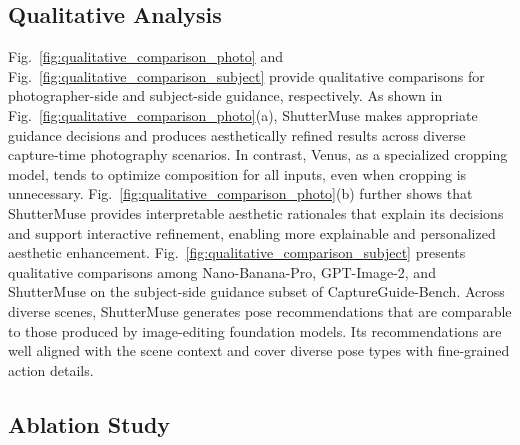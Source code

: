 \documentclass{llmxive}
\begin{document}
\subsection{Qualitative Analysis}

Fig.~\ref{fig:qualitative_comparison_photo} and Fig.~\ref{fig:qualitative_comparison_subject} provide qualitative comparisons for photographer-side and subject-side guidance, respectively. As shown in Fig.~\ref{fig:qualitative_comparison_photo}(a), ShutterMuse makes appropriate guidance decisions and produces aesthetically refined results across diverse capture-time photography scenarios. In contrast, Venus, as a specialized cropping model, tends to optimize composition for all inputs, even when cropping is unnecessary. Fig.~\ref{fig:qualitative_comparison_photo}(b) further shows that ShutterMuse provides interpretable aesthetic rationales that explain its decisions and support interactive refinement, enabling more explainable and personalized aesthetic enhancement. Fig.~\ref{fig:qualitative_comparison_subject} presents qualitative comparisons among Nano-Banana-Pro, GPT-Image-2, and ShutterMuse on the subject-side guidance subset of CaptureGuide-Bench. Across diverse scenes, ShutterMuse generates pose recommendations that are comparable to those produced by image-editing foundation models. Its recommendations are well aligned with the scene context and cover diverse pose types with fine-grained action details.
\subsection{Ablation Study}
\end{document}
